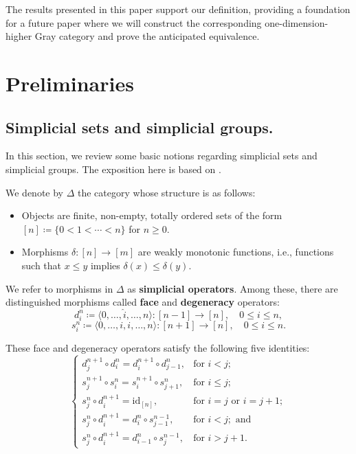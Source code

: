 \documentclass{tac}
\begin{document}
The results presented in this paper support our definition, providing a foundation for a future paper where we will construct the corresponding one-dimension-higher Gray category and prove the anticipated equivalence.


\section{Preliminaries}\label{sec-Preliminaries}

\subsection{Simplicial sets and simplicial groups.} 


In this section, we review some basic notions regarding simplicial sets and simplicial groups. The exposition here is based on \cite{RezkIntroQCats}.

We denote by $\Delta$ the category whose structure is as follows:
\begin{itemize}
  \item Objects are finite, non-empty, totally ordered sets of the form $[n] \coloneqq \{0 < 1 < \cdots < n\}$ for $n \ge 0$.
  \item Morphisms $\delta : [n] \rightarrow [m]$ are weakly monotonic functions, i.e., functions such that $x \le y$ implies $\delta(x) \le \delta(y)$.
\end{itemize}

We refer to morphisms in $\Delta$ as \textbf{simplicial operators}. Among these, there are distinguished morphisms called \textbf{face} and \textbf{degeneracy} operators:
\[
  d^n_i \coloneqq \langle 0, \dots, \hat{i}, \dots, n \rangle : [n - 1] \rightarrow [n], \quad 0 \le i \le n,
\]
\[
  s^n_i \coloneqq \langle 0, \dots, i, i, \dots, n \rangle : [n + 1] \rightarrow [n], \quad 0 \le i \le n.
\]

These face and degeneracy operators satisfy the following five identities:
\begin{equation}
\label{psgrp}
\left\{
  \begin{array}{ll}
    d^{n+1}_j \circ d^n_i = d^{n+1}_i \circ d^n_{j-1}, & \text{for } i < j; \\
    s^{n+1}_j \circ s^n_i = s^{n+1}_i \circ s^n_{j+1}, & \text{for } i \le j; \\
    s^n_j \circ d^{n+1}_i = \mathrm{id}_{[n]}, & \text{for } i = j \text{ or } i = j+1; \\
    s^n_j \circ d^{n+1}_i = d^n_i \circ s^{n-1}_{j-1}, & \text{for } i < j; \text{ and } \\
    s^n_j \circ d^{n+1}_i = d^n_{i-1} \circ s^{n-1}_j, & \text{for } i > j+1.
  \end{array}
\right.
\end{equation}
\end{document}
